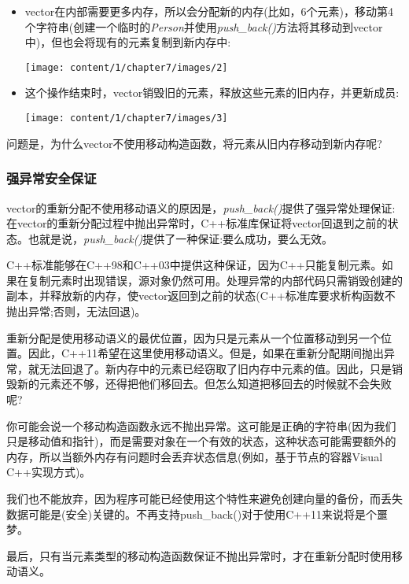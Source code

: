 \begin{itemize}
	\item vector在内部需要更多内存，所以会分配新的内存(比如，6个元素)，移动第4个字符串(创建一个临时的\textit{Person}并使用\textit{push_back()}方法将其移动到vector中)，但也会将现有的元素复制到新内存中:
\begin{center}
		\texttt{[image: content/1/chapter7/images/2]}
	\end{center}
	\item 这个操作结束时，vector销毁旧的元素，释放这些元素的旧内存，并更新成员:
\begin{center}
		\texttt{[image: content/1/chapter7/images/3]}
	\end{center}
\end{itemize}

问题是，为什么vector不使用移动构造函数，将元素从旧内存移动到新内存呢?

\subsubsection{强异常安全保证}

vector的重新分配不使用移动语义的原因是，\textit{push_back()}提供了强异常处理保证:在vector的重新分配过程中抛出异常时，C++标准库保证将vector回退到之前的状态。也就是说，\textit{push_back()}提供了一种保证:要么成功，要么无效。

C++标准能够在C++98和C++03中提供这种保证，因为C++只能复制元素。如果在复制元素时出现错误，源对象仍然可用。处理异常的内部代码只需销毁创建的副本，并释放新的内存，使vector返回到之前的状态(C++标准库要求析构函数不抛出异常;否则，无法回退)。

重新分配是使用移动语义的最优位置，因为只是元素从一个位置移动到另一个位置。因此，C++11希望在这里使用移动语义。但是，如果在重新分配期间抛出异常，就无法回退了。新内存中的元素已经窃取了旧内存中元素的值。因此，只是销毁新的元素还不够，还得把他们移回去。但怎么知道把移回去的时候就不会失败呢?

你可能会说一个移动构造函数永远不抛出异常。这可能是正确的字符串(因为我们只是移动值和指针)，而是需要对象在一个有效的状态，这种状态可能需要额外的内存，所以当额外内存有问题时会丢弃状态信息(例如，基于节点的容器Visual C++实现方式)。

我们也不能放弃，因为程序可能已经使用这个特性来避免创建向量的备份，而丢失数据可能是(安全)关键的。不再支持push_back()对于使用C++11来说将是个噩梦。

最后，只有当元素类型的移动构造函数保证不抛出异常时，才在重新分配时使用移动语义。

